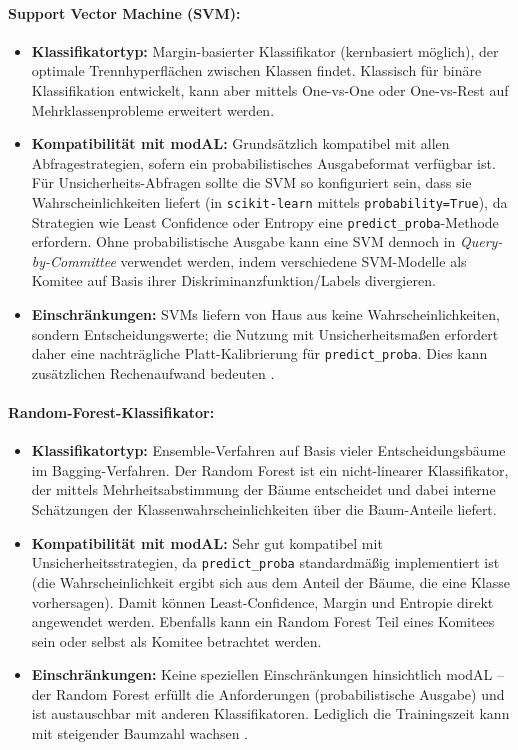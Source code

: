 \documentclass{article}
\begin{document}
\paragraph{Support Vector Machine (SVM):}
\begin{itemize}
	\item \textbf{Klassifikatortyp:} Margin-basierter Klassifikator (kernbasiert möglich), der optimale Trennhyperflächen zwischen Klassen findet. Klassisch für binäre Klassifikation entwickelt, kann aber mittels One-vs-One oder One-vs-Rest auf Mehrklassenprobleme erweitert werden.
	\item \textbf{Kompatibilität mit modAL:} Grundsätzlich kompatibel mit allen Abfragestrategien, sofern ein probabilistisches Ausgabeformat verfügbar ist. Für Unsicherheits-Abfragen sollte die SVM so konfiguriert sein, dass sie Wahrscheinlichkeiten liefert (in \texttt{scikit-learn} mittels \texttt{probability=True}), da Strategien wie Least Confidence oder Entropy eine \texttt{predict\_proba}-Methode erfordern. Ohne probabilistische Ausgabe kann eine SVM dennoch in \emph{Query-by-Committee} verwendet werden, indem verschiedene SVM-Modelle als Komitee auf Basis ihrer Diskriminanzfunktion/Labels divergieren.
	\item \textbf{Einschränkungen:} SVMs liefern von Haus aus keine Wahrscheinlichkeiten, sondern Entscheidungswerte; die Nutzung mit Unsicherheitsmaßen erfordert daher eine nachträgliche Platt-Kalibrierung für \texttt{predict\_proba}. Dies kann zusätzlichen Rechenaufwand bedeuten
	\cite{Cortes1995}.
\end{itemize}

\paragraph{Random-Forest-Klassifikator:}
\begin{itemize}
	\item \textbf{Klassifikatortyp:} Ensemble-Verfahren auf Basis vieler Entscheidungsbäume im Bagging-Verfahren. Der Random Forest ist ein nicht-linearer Klassifikator, der mittels Mehrheitsabstimmung der Bäume entscheidet und dabei interne Schätzungen der Klassenwahrscheinlichkeiten über die Baum-Anteile liefert.
	\item \textbf{Kompatibilität mit modAL:} Sehr gut kompatibel mit Unsicherheitsstrategien, da \texttt{predict\_proba} standardmäßig implementiert ist (die Wahrscheinlichkeit ergibt sich aus dem Anteil der Bäume, die eine Klasse vorhersagen). Damit können Least-Confidence, Margin und Entropie direkt angewendet werden. Ebenfalls kann ein Random Forest Teil eines Komitees sein oder selbst als Komitee betrachtet werden.
	\item \textbf{Einschränkungen:} Keine speziellen Einschränkungen hinsichtlich modAL – der Random Forest erfüllt die Anforderungen (probabilistische Ausgabe) und ist austauschbar mit anderen Klassifikatoren. Lediglich die Trainingszeit kann mit steigender Baumzahl wachsen
	\cite{Breiman2001}.
\end{itemize}
\end{document}
